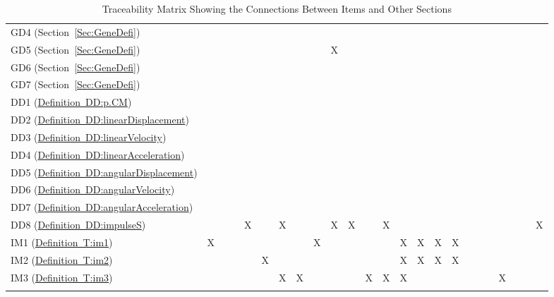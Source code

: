 \documentclass[12pt]{article}
\begin{document}
\begin{longtable}{l l l l l l l l l l l l l l l l l l l l l l l l}
\\
GD4 (Section~\ref{Sec:GeneDefi}) &  &  &  &  &  &  &  &  &  &  &  &  &  &  &  &  &  &  &  &  &  &  & 
\\
GD5 (Section~\ref{Sec:GeneDefi}) &  &  &  &  &  &  &  &  & X &  &  &  &  &  &  &  &  &  &  &  &  &  & 
\\
GD6 (Section~\ref{Sec:GeneDefi}) &  &  &  &  &  &  &  &  &  &  &  &  &  &  &  &  &  &  &  &  &  &  & 
\\
GD7 (Section~\ref{Sec:GeneDefi}) &  &  &  &  &  &  &  &  &  &  &  &  &  &  &  &  &  &  &  &  &  &  & 
\\
DD1 (\hyperref[DD:p.CM]{Definition~DD:p.CM}) &  &  &  &  &  &  &  &  &  &  &  &  &  &  &  &  &  &  &  &  &  &  & 
\\
DD2 (\hyperref[DD:linearDisplacement]{Definition~DD:linearDisplacement}) &  &  &  &  &  &  &  &  &  &  &  &  &  &  &  &  &  &  &  &  &  &  & 
\\
DD3 (\hyperref[DD:linearVelocity]{Definition~DD:linearVelocity}) &  &  &  &  &  &  &  &  &  &  &  &  &  &  &  &  &  &  &  &  &  &  & 
\\
DD4 (\hyperref[DD:linearAcceleration]{Definition~DD:linearAcceleration}) &  &  &  &  &  &  &  &  &  &  &  &  &  &  &  &  &  &  &  &  &  &  & 
\\
DD5 (\hyperref[DD:angularDisplacement]{Definition~DD:angularDisplacement}) &  &  &  &  &  &  &  &  &  &  &  &  &  &  &  &  &  &  &  &  &  &  & 
\\
DD6 (\hyperref[DD:angularVelocity]{Definition~DD:angularVelocity}) &  &  &  &  &  &  &  &  &  &  &  &  &  &  &  &  &  &  &  &  &  &  & 
\\
DD7 (\hyperref[DD:angularAcceleration]{Definition~DD:angularAcceleration}) &  &  &  &  &  &  &  &  &  &  &  &  &  &  &  &  &  &  &  &  &  &  & 
\\
DD8 (\hyperref[DD:impulseS]{Definition~DD:impulseS}) &  &  &  & X &  & X &  &  & X & X &  & X &  &  &  &  &  &  &  &  &  &  & X
\\
IM1 (\hyperref[T:im1]{Definition~T:im1}) & X &  &  &  &  &  &  & X &  &  &  &  & X & X & X & X &  &  &  &  &  &  & 
\\
IM2 (\hyperref[T:im2]{Definition~T:im2}) &  &  &  &  & X &  &  &  &  &  &  &  & X & X & X & X &  &  &  &  &  &  & 
\\
IM3 (\hyperref[T:im3]{Definition~T:im3}) &  &  &  &  &  & X & X &  &  &  & X & X & X &  &  &  &  &  &  & X &  &  & 
\\
\bottomrule
\caption{Traceability Matrix Showing the Connections Between Items and Other Sections}
\label{Table:TracMatrShowtheConnBetwItemandOtheSect}
\end{longtable}
\end{document}
